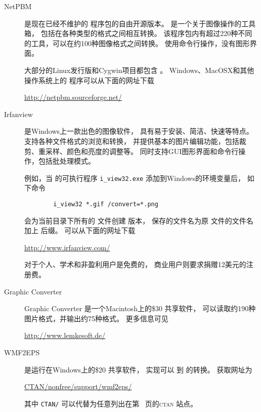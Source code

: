 \begin{description}
	\item[NetPBM]
	 是现在已经不维护的  程序包的自由开源版本。
	 是一个关于图像操作的工具箱，
	包括在各种类型的格式之间相互转换。
	该程序包内有超过220种不同的工具，可以在约100种图像格式之间转换。
	 使用命令行操作，没有图形界面。
	
	大部分的Linux发行版和Cygwin项目都包含 。
	Windows、MacOSX和其他操作系统上的  程序可以从下面的网址下载
	\begin{center}
		\url{http://netpbm.sourceforge.net/}
	\end{center}
	
	\item[Irfanview]
	
	 是Windows上一款出色的图像软件，
	具有易于安装、简洁、快速等特点。
	 支持各种文件格式的浏览和转换，
	并提供基本的图片编辑功能，包括裁剪、重采样、颜色和亮度的调整等。
	 同时支持GUI图形界面和命令行操作，包括批处理模式。
	
	例如，当 的可执行程序 \verb|i_view32.exe| 添加到Windows的环境变量后，
	如下命令
\begin{verbatim}
		i_view32 *.gif /convert=*.png
\end{verbatim}
	会为当前目录下所有的  文件创建  版本，
	保存的文件名为原  文件的文件名加上  后缀。
	 可以从下面的网址下载
	\begin{center}
		\url{http://www.irfanview.com/}
	\end{center}
	 对于个人、学术和非盈利用户是免费的，
	商业用户则要求捐赠12美元的注册费。
	
	\item[Graphic Converter]
	
	Graphic Converter 是一个Macintosh上的\$30 共享软件，
	可以读取约190种图片格式，并输出约75种格式。
	更多信息可见
	\begin{center}
		\url{http://www.lemkesoft.de/}
	\end{center}
	
	\item[WMF2EPS]
	
	 是运行在Windows上的\$20 共享软件，
	实现可以  到  的转换。
	获取网址为
	\begin{center}
		\href{ftp://ctan.tug.org/tex-archive/nonfree/support/wmf2eps/}{CTAN/nonfree/support/wmf2eps/}
	\end{center}
	其中 \texttt{CTAN/} 可以代替为任意列出在第~\pageref{ctan-sites} 页的\textsc{ctan} 站点。
	

\end{description}
